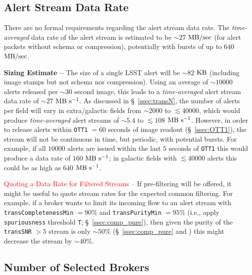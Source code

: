 \documentclass[DM,authoryear,toc]{lsstdoc}
\begin{document}
\subsection{Alert Stream Data Rate}\label{ssec:data_rate}

There are no formal requirements regarding the alert stream data rate. The {\it time-averaged} data rate of the alert stream is estimated to be $\sim27$ $\rm MB/sec$ (for alert packets without schema or compression), potentially with bursts of up to $640$ $\rm MB/sec$.


{\bf Sizing Estimate --} The size of a single LSST alert will be $\sim82$ $\rm KB$ (including image stamps but not schema nor compression). Using an average of $\sim10000$ alerts released per $\sim30$ second image, this leads to a {\it time-averaged} alert stream data rate of  $\sim27$ $\rm MB\ s^{-1}$. As discussed in \S~\ref{ssec:transN}, the number of alerts per field will vary in extra/galactic fields from $\sim2000$ to $\lesssim40000$, which would produce {\it time-averaged} alert streams of $\sim5.4$ to $\lesssim108$ $\rm MB\ s^{-1}$. However, in order to release alerts within {\tt OTT1} $=60$ seconds of image readout (\S~\ref{ssec:OTT1}), the stream will not be continuous in time, but periodic, with potential bursts. For example, if all $10000$ alerts are issued within the last $5$ seconds of {\tt OTT1} this would produce a data rate of $160$ $\rm MB\ s^{-1}$; in galactic fields with $\lesssim40000$ alerts this could be as high as $640$ $\rm MB\ s^{-1}$.

\textcolor{red}{Quoting a Data Rate for Filtered Streams --} If pre-filtering will be offered, it might be useful to quote stream rates for the expected common filtering. For example, if a broker wants to limit its incoming flow to an alert stream with {\tt transCompletenessMin} $=90\%$ and {\tt transPurityMin} $=95\%$ (i.e., apply {\tt spuriousness} threshold {\tt T}; \S~\ref{ssec:comp_pure}), then given the purity of the {\tt transSNR} $>5$ stream is only $\sim50\%$ (\S~\ref{ssec:comp_pure} and ) this might decrease the stream by $\sim40\%$. 



\subsection{Number of Selected Brokers}\label{ssec:num_brokers}
\end{document}
